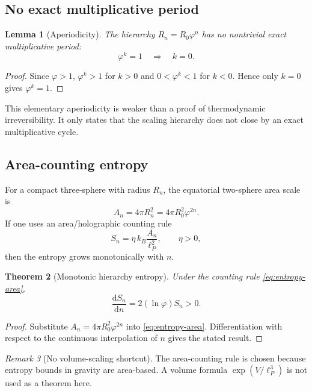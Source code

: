 \documentclass[11pt,a4paper]{article}
\newtheorem{theorem}{Theorem}[section]
\newtheorem{lemma}[theorem]{Lemma}
\theoremstyle{definition}
\theoremstyle{remark}
\newtheorem{remark}[theorem]{Remark}
\newcommand{\golden}{\varphi}
\newcommand{\dd}{\mathrm{d}}
\begin{document}
\subsection{No exact multiplicative period}

\begin{lemma}[Aperiodicity]
The hierarchy $R_{n}=R_{0}\golden^{n}$ has no nontrivial exact multiplicative period:
\[
\golden^{k}=1\quad\Longrightarrow\quad k=0.
\]
\end{lemma}

\begin{proof}
Since $\golden>1$, $\golden^{k}>1$ for $k>0$ and $0<\golden^{k}<1$ for $k<0$.  Hence only
$k=0$ gives $\golden^{k}=1$.
\end{proof}

This elementary aperiodicity is weaker than a proof of thermodynamic irreversibility.  It only
states that the scaling hierarchy does not close by an exact multiplicative cycle.

\subsection{Area-counting entropy}

For a compact three-sphere with radius $R_{n}$, the equatorial two-sphere area scale is
\begin{equation}
A_{n}=4\pi R_{n}^{2}=4\pi R_{0}^{2}\golden^{2n}.
\end{equation}
If one uses an area/holographic counting rule
\begin{equation}
S_{n}=\eta\, k_{B}\frac{A_{n}}{\ell_{P}^{2}},
\qquad \eta>0,
\label{eq:entropy-area}
\end{equation}
then the entropy grows monotonically with $n$.

\begin{theorem}[Monotonic hierarchy entropy]
Under the counting rule \eqref{eq:entropy-area},
\begin{equation}
\frac{\dd S_{n}}{\dd n}
=
2(\ln\golden)S_{n}>0.
\end{equation}
\end{theorem}

\begin{proof}
Substitute $A_{n}=4\pi R_{0}^{2}\golden^{2n}$ into \eqref{eq:entropy-area}.  Differentiation with
respect to the continuous interpolation of $n$ gives the stated result.
\end{proof}

\begin{remark}[No volume-scaling shortcut]
The area-counting rule is chosen because entropy bounds in gravity are area-based.  A volume
formula $\exp(V/\ell_{P}^{3})$ is not used as a theorem here.
\end{remark}
\end{document}
